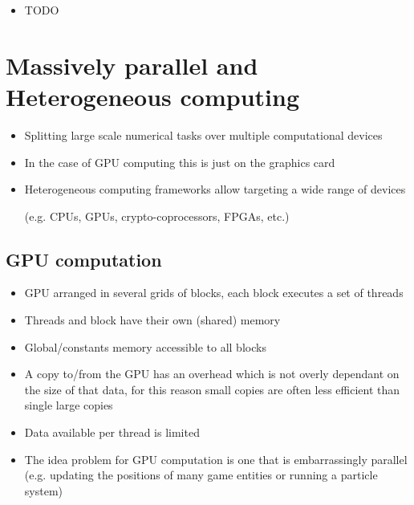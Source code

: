 \documentclass[a4paper]{article}
\begin{document}
\begin{itemize}
  \item
    TODO
\end{itemize}

\section{Massively parallel and Heterogeneous computing}

\begin{itemize}
  \item
    Splitting large scale numerical tasks over multiple computational devices

  \item
    In the case of GPU computing this is just on the graphics card

  \item
    Heterogeneous computing frameworks allow targeting a wide range of devices

    (e.g. CPUs, GPUs, crypto-coprocessors, FPGAs, etc.)

\end{itemize}

\subsection{GPU computation}

\begin{itemize}
  \item
    GPU arranged in several grids of blocks, each block executes a set of
    threads

  \item
    Threads and block have their own (shared) memory

  \item
    Global/constants memory accessible to all blocks

  \item
    A copy to/from the GPU has an overhead which is not overly dependant on the
    size of that data, for this reason small copies are often less efficient
    than single large copies

  \item
    Data available per thread is limited

  \item
    The idea problem for GPU computation is one that is embarrassingly parallel
    (e.g. updating the positions of many game entities or running a particle
    system)

\end{itemize}
\end{document}
